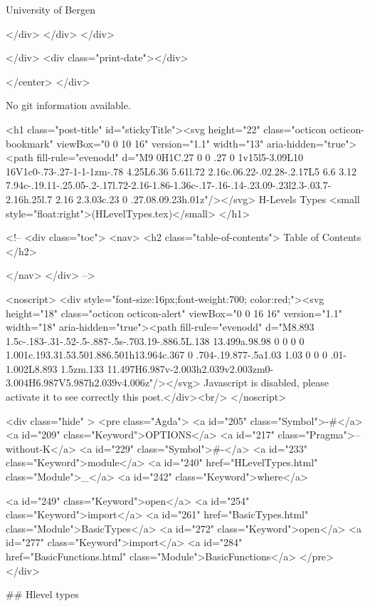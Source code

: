                   University of Bergen
                
                </div>
            </div>
          </div>
          
          
        </div>
        <div class="print-date"></div>
        
        
    </center>
  </div>

  
  No git information available.
  

  <h1 class="post-title" id="stickyTitle"><svg height="22" class="octicon octicon-bookmark" viewBox="0 0 10 16" version="1.1" width="13" aria-hidden="true"><path fill-rule="evenodd" d="M9 0H1C.27 0 0 .27 0 1v15l5-3.09L10 16V1c0-.73-.27-1-1-1zm-.78 4.25L6.36 5.61l.72 2.16c.06.22-.02.28-.2.17L5 6.6 3.12 7.94c-.19.11-.25.05-.2-.17l.72-2.16-1.86-1.36c-.17-.16-.14-.23.09-.23l2.3-.03.7-2.16h.25l.7 2.16 2.3.03c.23 0 .27.08.09.23h.01z"/></svg> H-Levels Types <small style="float:right">(HLevelTypes.tex)</small>
  </h1>

  <!-- 
  <div class="toc">
    <nav>
    <h2 class="table-of-contents"> Table of Contents </h2>
      

    </nav>
  </div>
   -->

  <noscript>
  <div style="font-size:16px;font-weight:700; color:red;"><svg height="18" class="octicon octicon-alert" viewBox="0 0 16 16" version="1.1" width="18" aria-hidden="true"><path fill-rule="evenodd" d="M8.893 1.5c-.183-.31-.52-.5-.887-.5s-.703.19-.886.5L.138 13.499a.98.98 0 0 0 0 1.001c.193.31.53.501.886.501h13.964c.367 0 .704-.19.877-.5a1.03 1.03 0 0 0 .01-1.002L8.893 1.5zm.133 11.497H6.987v-2.003h2.039v2.003zm0-3.004H6.987V5.987h2.039v4.006z"/></svg> Javascript is disabled, please activate it to see correctly this post.</div><br/>
  </noscript>

  <div class="hide" >
<pre class="Agda">
<a id="205" class="Symbol">{-#</a> <a id="209" class="Keyword">OPTIONS</a> <a id="217" class="Pragma">--without-K</a> <a id="229" class="Symbol">#-}</a>
<a id="233" class="Keyword">module</a> <a id="240" href="HLevelTypes.html" class="Module">_</a> <a id="242" class="Keyword">where</a>

<a id="249" class="Keyword">open</a> <a id="254" class="Keyword">import</a> <a id="261" href="BasicTypes.html" class="Module">BasicTypes</a>
<a id="272" class="Keyword">open</a> <a id="277" class="Keyword">import</a> <a id="284" href="BasicFunctions.html" class="Module">BasicFunctions</a>
</pre>
</div>


## Hlevel types

